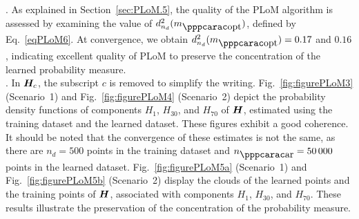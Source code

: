 . As explained in Section~\ref{sec:PLoM.5}, the quality of the PLoM algorithm is assessed by examining the value of $d_{n_d}^2(m_\opt)$, defined by Eq.~\eqref{eqPLoM6}. At convergence, we obtain
$d_{n_d}^2(m_\opt) =0.17$ and $0.16$, indicating excellent quality of PLoM to preserve the concentration of the learned probability measure.\\

. In ${\boldsymbol{H}}_c$,
the subscript $c$ is removed to simplify the writing. Fig.~\ref{fig:figurePLoM3} (Scenario~1) and Fig.~\ref{fig:figurePLoM4} (Scenario~2)
depict the  probability density functions of components $H_1$, $H_{30}$, and $H_{70}$ of ${\boldsymbol{H}}$, estimated using the training dataset and the learned dataset. These figures exhibit a good coherence. It should be noted that the convergence of these estimates is not the same, as there are $n_d=500$ points in the training dataset and $n_\ar =50\, 000$ points in the learned dataset.
Fig.~\ref{fig:figurePLoM5a} (Scenario~1) and Fig.~\ref{fig:figurePLoM5b} (Scenario~2) display the clouds of the learned points and the training points of ${\boldsymbol{H}}$, associated with components $H_1$, $H_{30}$, and $H_{70}$. These results illustrate the preservation of the concentration of the probability measure.
%
